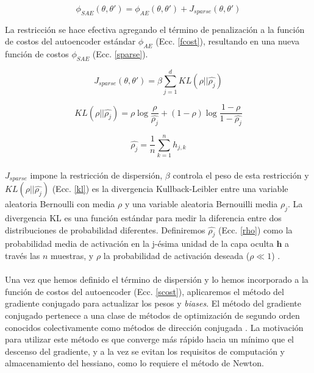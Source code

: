 \documentclass[a4paper,12pt]{article}
\begin{document}
\begin{equation}
\label{sparse}
\phi_{SAE}(\theta,\theta')=\phi_{AE}(\theta,\theta')+J_{sparse}(\theta,\theta')
\end{equation}

La restricción se hace efectiva agregando el término de penalización a la función de costos del autoencoder estándar $\phi_{AE}$ (Ecc. \ref{fcost}), resultando en una nueva función de costos $\phi_{SAE}$ (Ecc. \ref{sparse}).

\begin{equation}
\label{spterm}
J_{sparse}(\theta,\theta')=\beta\sum_{j=1}^{d}KL(\rho||\hat{\rho_{j}})
\end{equation} 

\begin{equation}
\label{kl}
KL(\rho||\hat{\rho_{j}})={\rho} \log\frac{\rho}{\hat{\rho_{j}}}+(1-\rho)\log\frac{1-\rho}{1-\hat{\rho_{j}}}
\end{equation} 

\begin{equation}
\label{rho}
\hat{\rho_{j}}=\frac{1}{n}\sum_{k=1}^{n}h_{j,k}
\end{equation} 

\paragraph{}
$J_{sparse}$ impone la restricción de dispersión, $\beta$ controla el peso de esta restricción y $KL(\rho||\hat{\rho_{j}})$ (Ecc. \ref{kl}) es la divergencia Kullback-Leibler entre una variable aleatoria Bernoulli con media $\rho$ y una variable aleatoria Bernouilli media $\hat{\rho_{j}}$. La divergencia KL es una función estándar para medir la diferencia entre dos distribuciones de probabilidad diferentes. Definiremos $\hat{\rho_{j}}$ (Ecc. \ref{rho}) como la probabilidad media de activación en la j-ésima unidad de la capa oculta $\textbf{h}$ a través las $n$ muestras, y $\rho$ la probabilidad de activación deseada ($\rho\ll1$) \cite{song}. 

\paragraph{}
Una vez que hemos definido el término de dispersión y lo hemos incorporado a la función de costos del autoencoder (Ecc. \ref{scost}), aplicaremos el método del gradiente conjugado para actualizar los pesos y \textit{biases}. El método del gradiente conjugado pertenece a una clase de métodos de optimización de segundo orden conocidos colectivamente como métodos de dirección conjugada \cite{haykin}. La motivación para utilizar este método es que converge más rápido hacia un mínimo que el descenso del gradiente, y a la vez se evitan los requisitos de computación y almacenamiento del hessiano, como lo requiere el método de Newton.
\end{document}
